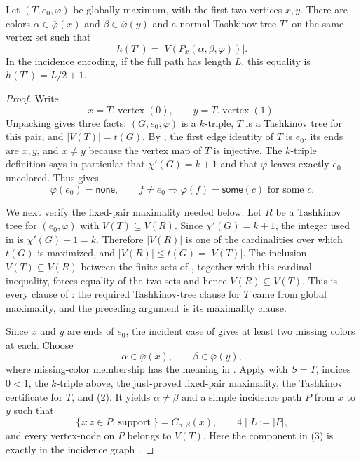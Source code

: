 \begin{lemma}
Let $(T,e_0,\varphi)$ be globally maximum, with the first two vertices
$x,y$.  There are colors $\alpha\in\overline\varphi(x)$ and
$\beta\in\overline\varphi(y)$ and a normal Tashkinov tree $T'$ on the
same vertex set such that
\[
 h(T')=|V(P_x(\alpha,\beta,\varphi))|.
\]
In the incidence encoding, if the full path has length $L$, this equality
is $h(T')=L/2+1$.
\end{lemma}
\begin{proof}
Write
\[
 x=T.\operatorname{vertex}(0),\qquad
 y=T.\operatorname{vertex}(1).
\]
Unpacking  gives three facts: $(G,e_0,
\varphi)$ is a $k$-triple, $T$ is a Tashkinov tree for this pair, and
$|V(T)|=t(G)$.  By , the first edge identity of
$T$ is $e_0$, its ends are $x,y$, and $x\ne y$ because the vertex map of
$T$ is injective.  The $k$-triple definition  says in
particular that $\chi'(G)=k+1$ and that $\varphi$ leaves exactly $e_0$
uncolored.  Thus  gives
\[
 \varphi(e_0)=\mathsf{none},\qquad
 f\ne e_0\Longrightarrow \varphi(f)=\mathsf{some}(c)
 \text{ for some }c.
\tag{1}
\]

We next verify the fixed-pair maximality needed below.  Let $R$ be a
Tashkinov tree for $(e_0,\varphi)$ with $V(T)\subseteq V(R)$.  Since
$\chi'(G)=k+1$, the integer used in  is
$\chi'(G)-1=k$.  Therefore $|V(R)|$ is one of the cardinalities over
which $t(G)$ is maximized, and $|V(R)|\le t(G)=|V(T)|$.  The inclusion
$V(T)\subseteq V(R)$ between the finite sets of
, together with this cardinal inequality,
forces equality of the two sets and hence $V(R)\subseteq V(T)$.  This is
every clause of : the required
Tashkinov-tree clause for $T$ came from global maximality, and the preceding
argument is its maximality clause.

Since $x$ and $y$ are ends of $e_0$, the incident case of
 gives at least two missing
colors at each.  Choose
\[
 \alpha\in\overline\varphi(x),\qquad
 \beta\in\overline\varphi(y),
\tag{2}
\]
where missing-color membership has the meaning in
.  Apply  with
$S=T$, indices $0<1$, the $k$-triple above, the just-proved fixed-pair
maximality, the Tashkinov certificate for $T$, and (2).  It yields
$\alpha\ne\beta$ and a simple incidence path $P$ from $x$ to $y$ such
that
\[
 \{z:z\in P.\operatorname{support}\}
 =C_{\alpha,\beta}(x),\qquad 4\mid L:=|P|,
\tag{3}
\]
and every vertex-node on $P$ belongs to $V(T)$.  Here the component in
(3) is exactly  in the incidence graph
.


\end{proof}
